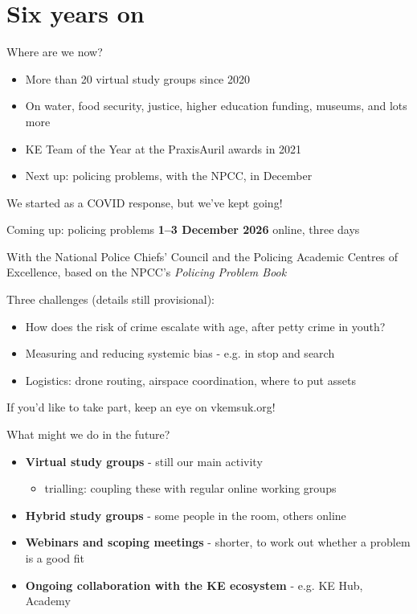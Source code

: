\documentclass[aspectratio=169,11pt]{beamer}
\begin{document}
\section{Six years on}

\begin{frame}{Where are we now?}
  \begin{itemize}
    \item More than 20 virtual study groups since 2020
    \item On water, food security, justice, higher education funding,
      museums, and lots more
    \item KE Team of the Year at the PraxisAuril awards in 2021
    \item Next up: policing problems, with the NPCC, in December
  \end{itemize}
  \vfill
  We started as a COVID response, but we've kept going!
\end{frame}

\begin{frame}{Coming up: policing problems}
  \textbf{1--3 December 2026} \quad\textbar\quad online, three days

  With the National Police Chiefs' Council and the Policing Academic Centres
  of Excellence, based on the NPCC's \emph{Policing Problem Book}

  \vspace{0.6em}
  Three challenges (details still provisional):
  \begin{itemize}
    \item How does the risk of crime escalate with age, after petty crime in
      youth?
    \item Measuring and reducing systemic bias - e.g. in stop and search
    \item Logistics: drone routing, airspace coordination, where to put assets
  \end{itemize}
  \vfill
  If you'd like to take part, keep an eye on vkemsuk.org!
\end{frame}

\begin{frame}{What might we do in the future?}
  \begin{itemize}
    \item \textbf{Virtual study groups} - still our main activity
    \begin{itemize}
    \item trialling: coupling these with regular online working groups
    \end{itemize}
    \item \textbf{Hybrid study groups} - some people in the room, others online
    \item \textbf{Webinars and scoping meetings} - shorter, to work out whether a
      problem is a good fit
    \item \textbf{Ongoing collaboration with the KE ecosystem} - e.g. KE Hub, Academy
  \end{itemize}
\end{frame}
\end{document}
